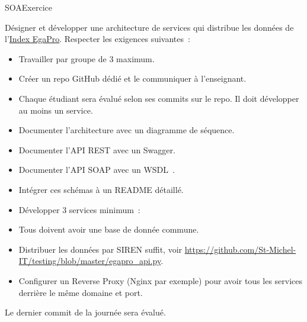\documentclass{beamer}
\begin{document}
    \begin{frame}{SOA}{Exercice \execcounterdispinc{}}
        \begin{tiny}
            Désigner et développer une architecture de services qui distribue les données de l'\href{https://www.data.gouv.fr/fr/datasets/index-egalite-professionnelle-f-h-des-entreprises-de-50-salaries-ou-plus/}{Index EgaPro}.
            Respecter les exigences suivantes~:
            \begin{itemize}
                \item Travailler par groupe de 3 maximum.
                \item Créer un repo GitHub dédié et le communiquer à l'enseignant.
                \item Chaque étudiant sera évalué selon ses commits sur le repo.
                Il doit développer au moins un service.
                \item Documenter l'architecture avec un diagramme de séquence.
                \item Documenter l'API REST avec un Swagger.
                \item Documenter l'API SOAP avec un WSDL~.
                \item Intégrer ces schémas à un README détaillé.
                \item Développer 3 services minimum~:
                \begin{itemize}
                \end{itemize}
                \item Tous doivent avoir une base de donnée commune.
                \item Distribuer les données par SIREN suffit, voir \url{https://github.com/St-Michel-IT/testing/blob/master/egapro_api.py}.
                \item Configurer un Reverse Proxy (Nginx par exemple) pour avoir tous les services derrière le même domaine et port.
            \end{itemize}
            \begin{dangercolorbox}
                Le dernier commit de la journée sera évalué.
            \end{dangercolorbox}
        \end{tiny}
    \end{frame}
\end{document}
